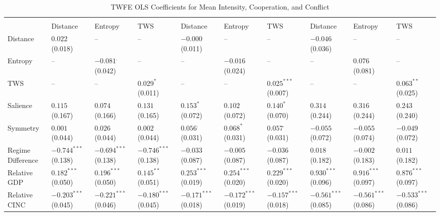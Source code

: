 \documentclass[12pt]{article}
\begin{document}
\begin{table}[htbp]\scriptsize
\centering
\caption{TWFE OLS Coefficients for Mean Intensity, Cooperation, and Conflict}
\renewcommand{\arraystretch}{1.2}
\begin{tabularx}{\textwidth}{
    l
    >{\centering\arraybackslash}X >{\centering\arraybackslash}X >{\centering\arraybackslash}X
    >{\centering\arraybackslash}X >{\centering\arraybackslash}X >{\centering\arraybackslash}X
    >{\centering\arraybackslash}X >{\centering\arraybackslash}X >{\centering\arraybackslash}X
}
\toprule
\rowcolor{gray!20}
 & \multicolumn{3}{c}{\textbf{Mean}} 
 & \multicolumn{3}{c}{\textbf{Cooperation}} 
 & \multicolumn{3}{c}{\textbf{Conflict}} \\
\cmidrule(lr){2-4} \cmidrule(lr){5-7} \cmidrule(lr){8-10}
 & Distance & Entropy & TWS & Distance & Entropy & TWS & Distance & Entropy & TWS \\
\midrule
Distance & $0.022^{}$ (0.018) & -- & -- & $-0.000^{}$ (0.011) & -- & -- & $-0.046^{}$ (0.036) & -- & -- \\
Entropy & -- & $-0.081^{.}$ (0.042) & -- & -- & $-0.016^{}$ (0.024) & -- & -- & $0.076^{}$ (0.081) & -- \\
TWS & -- & -- & $0.029^{*}$ (0.011) & -- & -- & $0.025^{***}$ (0.007) & -- & -- & $0.063^{**}$ (0.025) \\
Salience & $0.115^{}$ (0.167) & $0.074^{}$ (0.166) & $0.131^{}$ (0.165) & $0.153^{*}$ (0.072) & $0.102^{}$ (0.072) & $0.140^{*}$ (0.070) & $0.314^{}$ (0.244) & $0.316^{}$ (0.244) & $0.243^{}$ (0.240) \\
Symmetry & $0.001^{}$ (0.044) & $0.026^{}$ (0.044) & $0.002^{}$ (0.044) & $0.056^{.}$ (0.031) & $0.068^{*}$ (0.031) & $0.057^{.}$ (0.031) & $-0.055^{}$ (0.072) & $-0.055^{}$ (0.074) & $-0.049^{}$ (0.072) \\
Regime Difference & $-0.744^{***}$ (0.138) & $-0.694^{***}$ (0.138) & $-0.746^{***}$ (0.138) & $-0.033^{}$ (0.087) & $-0.005^{}$ (0.087) & $-0.036^{}$ (0.087) & $0.018^{}$ (0.182) & $-0.002^{}$ (0.183) & $0.011^{}$ (0.182) \\
Relative GDP & $0.182^{***}$ (0.050) & $0.196^{***}$ (0.050) & $0.145^{**}$ (0.051) & $0.253^{***}$ (0.019) & $0.254^{***}$ (0.020) & $0.229^{***}$ (0.020) & $0.930^{***}$ (0.096) & $0.916^{***}$ (0.097) & $0.876^{***}$ (0.097) \\
Relative CINC & $-0.203^{***}$ (0.045) & $-0.221^{***}$ (0.046) & $-0.180^{***}$ (0.045) & $-0.171^{***}$ (0.018) & $-0.172^{***}$ (0.019) & $-0.157^{***}$ (0.018) & $-0.561^{***}$ (0.085) & $-0.561^{***}$ (0.086) & $-0.533^{***}$ (0.086) \\

\end{tabularx}
\end{table}
\end{document}
